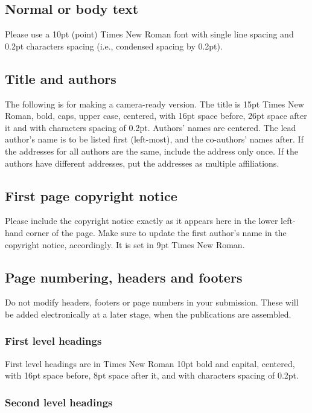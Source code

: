 \documentclass[11pt]{article}
\begin{document}
\subsection{Normal or body text}\label{subsec:body}

Please use a 10pt (point) Times New Roman font with single line spacing and 0.2pt characters spacing (i.e., condensed spacing by 0.2pt).

\subsection{Title and authors}

The following is for making a camera-ready version.
The title is 15pt Times New Roman, bold, caps, upper case, centered, with 16pt space before, 26pt space after it and with characters spacing of 0.2pt.
Authors' names are centered.
The lead author's name is to be listed first (left-most), and the co-authors' names after.
If the addresses for all authors are the same, include the address only once.
If the authors have different addresses, put the addresses as multiple affiliations.

\subsection{First page copyright notice}
Please include the copyright notice exactly as it appears here in the lower left-hand corner of the page.
Make sure to update the first author’s name in the copyright notice, accordingly. It is set in 9pt Times New Roman. 

\subsection{Page numbering, headers and footers}

Do not modify headers, footers or page numbers in your submission. These will be added electronically at a later stage, when the publications are assembled.

\subsubsection{First level headings}

First level headings are in Times New Roman 10pt bold and capital, centered, with 16pt space before, 8pt space after it, and with characters spacing of 0.2pt. 

\subsubsection{Second level headings}
\end{document}
